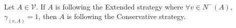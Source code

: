 \begin{lemma} \ \\
  \label{conservativeextended}
  Let $A \in \mathcal{V}$. If $A$ is following the Extended strategy where $\forall v \in N^{-}\left(A\right),$
  $\gamma_{\left(v, A\right)} = 1$, then $A$ is following the Conservative strategy.
\end{lemma}
